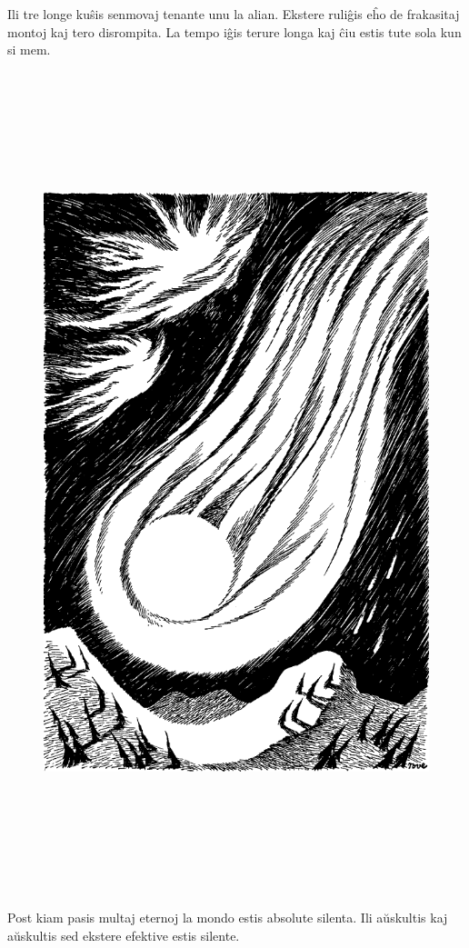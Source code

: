 Ili tre longe kuŝis senmovaj tenante unu la alian. Ekstere ruliĝis eĥo de frakasitaj montoj kaj tero disrompita. La tempo iĝis terure longa kaj ĉiu estis tute sola kun si mem.

\begin{figure}[htbp]
\centering
\includegraphics[width=449pt,height=677pt]{9-12.png}
\caption{}
\label{9-12}
\end{figure}

Post kiam pasis multaj eternoj la mondo estis absolute silenta. Ili aŭskultis kaj aŭskultis sed ekstere efektive estis silente.

